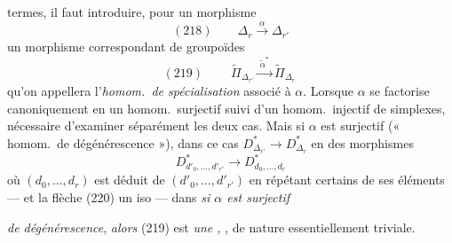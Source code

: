 \documentclass[11pt,a4paper]{article}
\begin{document}
termes, il faut introduire, \struck{\ill{}} pour un morphisme
\[
  (218) \qquad \Delta_r \xrightarrow{\ \alpha\ } \Delta_{r'}
\]
un morphisme correspondant de groupoïdes
\[
  (219) \qquad \boxed{\ \widetilde{\Pi}_{\Delta_{r'}} \xrightarrow{\ \widetilde{\alpha}^{*}\ } \widetilde{\Pi}_{\Delta_r}\ }
\]
qu'on appellera l'\emph{homom.\ de spécialisation} associé à $\alpha$.
Lorsque $\alpha$ se factorise canoniquement en un homom.\ surjectif suivi d'un
homom.\ injectif de simplexes, \ill{}  nécessaire d'examiner
séparément les deux cas. Mais si $\alpha$ est surjectif
 (« homom.\ de dégénérescence »),
 
  dans ce cas
$D^{*}_{\Delta_{r'}} \to D^{*}_{\Delta_r}$  \ill{} 
en des morphismes
\[
  D^{*}_{d'_0,\dots,d'_{r'}} \longrightarrow D^{*}_{d_0,\dots,d_r}
\]
où $(d_0,\dots,d_r)$ est déduit de $(d'_0,\dots,d'_{r'})$ en répétant certains
de ses éléments — et la flèche (220)  un iso — dans
\emph{si $\alpha$ est surjectif}

\emph{de dégénérescence}, \emph{alors} (219) est \emph{une \struck{\ill{}}
, \uncertain{\ill{}}}, de nature essentiellement triviale.
\end{document}
